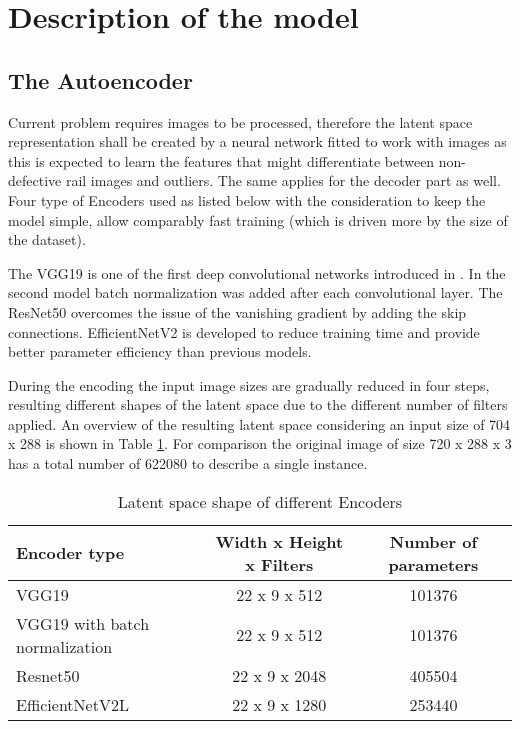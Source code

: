 \section{Description of the model} \label{model}
\subsection{The Autoencoder}
Current problem requires images to be processed, therefore the latent space representation
shall be created by a neural network fitted to work with images as this is expected to learn
the features that might differentiate between non-defective rail images and outliers.
The same applies for the decoder part as well.
Four type of Encoders used as listed below with the consideration to keep the model simple,
allow comparably fast training (which is driven more by the size of the dataset).

The VGG19 is one of the first deep convolutional networks introduced in \cite{simonyan_very_2015}.
In the second model batch normalization was added after each convolutional layer.
The ResNet50 \cite{he_deep_2015} overcomes the issue of the vanishing gradient
by adding the skip connections.
EfficientNetV2 \cite{tan_efficientnetv2_2021} is developed to reduce training time
and provide better parameter efficiency than previous models.

During the encoding the input image sizes are gradually reduced in four steps,
resulting different shapes of the latent space due to the different number of filters applied.
An overview of the resulting latent space considering an input size of 704 x 288
is shown in Table \ref{table:latent_space_shape}.
For comparison the original image of size 720 x 288 x 3 has a total number of 622080 to describe
a single instance.

\begin{table}[H]
    \centering
    \begin{tabular}{l c c}
        Encoder type                   & Width x Height x Filters & Number of parameters \\
        \hline
        VGG19                          & 22 x 9 x 512             & 101376               \\
        VGG19 with batch normalization & 22 x 9 x 512             & 101376               \\
        Resnet50                       & 22 x 9 x 2048            & 405504               \\
        EfficientNetV2L                & 22 x 9 x 1280            & 253440               \\
    \end{tabular}
    \caption{Latent space shape of different Encoders}
    \label{table:latent_space_shape}
\end{table}

